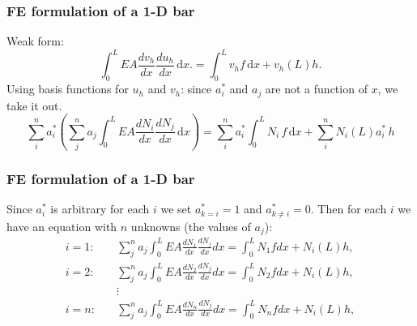 \documentclass[notes]{beamer}
\begin{document}
\begin{frame}
\frametitle{FE formulation of a 1-D bar}
Weak form:
\begin{equation*}
\int_0^L EA \frac{dv_h}{dx} \frac{du_h}{dx}\, \mathrm{d}x. = \int_0^L v_h f\, \mathrm{d}x + v_h(L)h.
\end{equation*}
Using basis functions for $u_h$ and $v_h$:
since $a_i^*$  and $a_j$ are not a function of $x$, we take it out.
\begin{equation*}
	\sum_i^n a_i^* \left(\sum_j^n a_j \int_0^L EA \frac{dN_i}{dx}\frac{dN_j}{dx}\, \mathrm{d}x \right)  = \sum_i^n a_i^* \int_0^L N_i \,f\,\mathrm{d}x + \sum_i^n N_i(L) a_i^*\,h
\end{equation*}
\end{frame}


\begin{frame}
\frametitle{FE formulation of a 1-D bar}
Since $a_i^*$ is arbitrary for each $i$ we set $a_{k=i}^*=1$ and $a_{k \ne i}^*=0$. Then for each $i$ we have an equation with $n$ unknowns (the values of $a_j$):
\begin{align*}
i = 1: \quad & \sum_j^n {a_j} \int_{0}^{L}EA \frac{dN_1}{dx}\frac{dN_j}{dx} dx = \int_{0}^{L}N_1 f dx + N_i(L)h, \\
i = 2: \quad & \sum_j^n {a_j} \int_{0}^{L}EA \frac{dN_2}{dx}\frac{dN_j}{dx} dx = \int_{0}^{L}N_2 f dx + N_i(L)h, \\
\quad & \vdots \\
i = n: \quad & \sum_j^n {a_j} \int_{0}^{L}EA \frac{dN_n}{dx}\frac{dN_j}{dx} dx = \int_{0}^{L}N_n f dx + N_i(L)h,
\end{align*}
\end{frame}
\end{document}
